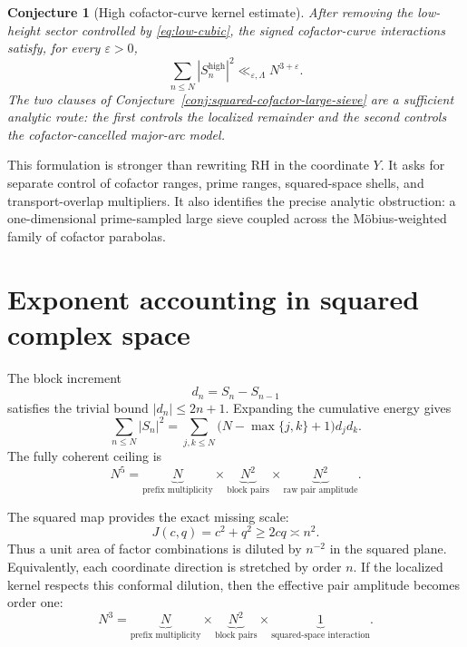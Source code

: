 \documentclass[11pt]{article}
\newtheorem{conjecture}[theorem]{Conjecture}
\theoremstyle{definition}
\theoremstyle{remark}
\newcommand{\eps}{\varepsilon}
\newcommand{\1}{\mathbf{1}}
\begin{document}
\begin{conjecture}[High cofactor-curve kernel estimate]
\label{conj:high-kernel}
After removing the low-height sector controlled by
\cref{eq:low-cubic}, the signed cofactor-curve interactions satisfy,
for every $\eps>0$,
\begin{equation}
 \sum_{n\le N}|S_n^{\mathrm{high}}|^2
 \ll_{\eps,\Lambda}N^{3+\eps}.
 \label{eq:high-kernel-bound}
\end{equation}
The two clauses of Conjecture~\ref{conj:squared-cofactor-large-sieve}
are a sufficient analytic route: the first controls the localized
remainder and the second controls the cofactor-cancelled major-arc
model.
\end{conjecture}

This formulation is stronger than rewriting RH in the coordinate $Y$.
It asks for separate control of cofactor ranges, prime ranges,
squared-space shells, and transport-overlap multipliers.  It also
identifies the precise analytic obstruction: a one-dimensional
prime-sampled large sieve coupled across the M\"obius-weighted family of
cofactor parabolas.


\section{Exponent accounting in squared complex space}
\label{sec:exponent-accounting}

The block increment
\begin{equation}
 d_n=S_n-S_{n-1}
 \label{eq:d-n}
\end{equation}
satisfies the trivial bound $|d_n|\le2n+1$.  Expanding the cumulative energy gives
\begin{equation}
 \sum_{n\le N}|S_n|^2
 =
 \sum_{j,k\le N}
 \bigl(N-\max\{j,k\}+1\bigr)d_jd_k.
 \label{eq:triangular-energy}
\end{equation}
The fully coherent ceiling is
\begin{equation}
 N^5
 =
 \underbrace{N}_{\text{prefix multiplicity}}
 \times
 \underbrace{N^2}_{\text{block pairs}}
 \times
 \underbrace{N^2}_{\text{raw pair amplitude}}.
 \label{eq:N5-accounting}
\end{equation}

The squared map provides the exact missing scale:
\begin{equation}
 J(c,q)=c^2+q^2\ge2cq\asymp n^2.
 \label{eq:two-power-J}
\end{equation}
Thus a unit area of factor combinations is diluted by $n^{-2}$ in the squared plane.  Equivalently, each coordinate direction is stretched by order $n$.  If the localized kernel respects this conformal dilution, then the effective pair amplitude becomes order one:
\begin{equation}
 N^3
 =
 \underbrace{N}_{\text{prefix multiplicity}}
 \times
 \underbrace{N^2}_{\text{block pairs}}
 \times
 \underbrace{1}_{\text{squared-space interaction}}.
 \label{eq:N3-accounting}
\end{equation}
\end{document}
